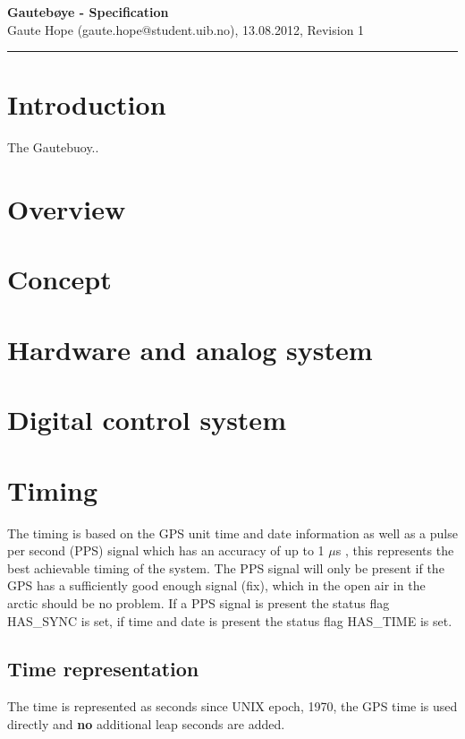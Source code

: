 \documentclass[a4paper]{article}
\newcommand{\makeheading}[2]%
        {\hspace*{-\marginparsep minus \marginparwidth}%
         \begin{minipage}[t]{\textwidth\marginparwidth\marginparsep}%
           {\large \bfseries #1}\\{#2}\\[-0.15\baselineskip]%
                 \rule{\columnwidth}{1pt}%
         \end{minipage}}
\begin{document}
\makeheading{Gautebøye - Specification}{Gaute Hope
(gaute.hope@student.uib.no), 13.08.2012, Revision 1}

\vspace{2em}
\section*{Introduction}
The Gautebuoy..

\vspace{2em}

\begin{multicols}{2}
  \section{Overview}

  \section{Concept}

  \section{Hardware and analog system}

  \section{Digital control system}

  \section{Timing}
  The timing is based on the GPS unit time and date information as well
  as a pulse per second (PPS) signal which has an accuracy of up to 1
  $\mu$s \cite{em_406A_gps_ds}, this represents the best achievable
  timing of the system. The PPS signal will
  only be present if the GPS has a sufficiently good enough signal (fix),
  which in the open air in the arctic should be no problem. If a PPS
  signal is present the status flag HAS\_SYNC is set, if time and date
  is present the status flag HAS\_TIME is set.

  \subsection{Time representation}
  The time is represented as seconds since UNIX epoch, 1970, the GPS
  time is used directly and \textbf{no} additional leap seconds are added.


\end{multicols}
\end{document}

